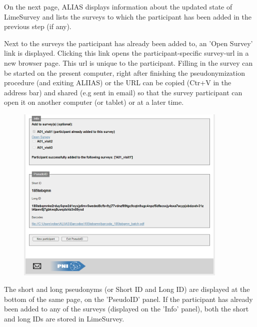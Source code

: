 On the next page, ALIAS displays information about the updated state of LimeSurvey and lists the surveys to which the participant has been added in the previous step (if any).

Next to the surveys the participant has already been added to, an 'Open Survey' link is displayed. Clicking this link opens the participant-specific survey-url in a new browser page. This url is unique to the participant. Filling in the survey can be started on the present computer, right after finishing the pseudonymization procedure (and exiting ALIIAS) or the URL can be copied (Ctr+V in the address bar) and shared (e.g sent in email) so that the survey participant can open it on another computer (or tablet) or at a later time.

\hspace{2mm}

\small\setlength\fboxsep{5pt}\setlength\fboxrule{1pt}

\large

\begin{figure}[H]
\includegraphics[width=0.9\textwidth]{docs/fig/05_pseudonym.PNG}
\end{figure}

The short and long pseudonyms (or Short ID and Long ID) are displayed at the bottom of the same page, on the 'PseudoID' panel. If the participant has already been added to any of the surveys (displayed on the 'Info' panel), both the short and long IDs are stored in LimeSurvey. 

